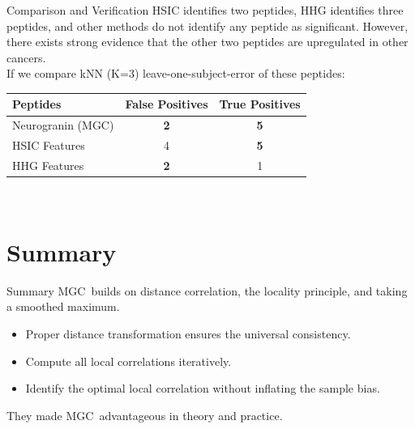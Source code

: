 \documentclass[mathserif,t]{beamer}
\newcommand{\Mgc}{MGC}
\begin{document}
\begin{frame}{Comparison and Verification}
\pause
HSIC identifies two peptides, HHG identifies three peptides, and other methods do not identify any peptide as significant. However, there exists strong evidence that the other two peptides are upregulated in other cancers.\\

\pause
\medskip
If we compare kNN (K=3) leave-one-subject-error of these peptides: 
\medskip
\begin{tabular}{|l||c|c|}
\hline
Peptides & False Positives & True Positives   \\
\hline
 \textcolor{UniOrange}{Neurogranin (MGC)}  & \textbf{2}  & \textbf{5} \\
\hline
HSIC Features & 4  & \textbf{5}  \\
\hline
HHG Features & \textbf{2}  & 1  \\
\hline
\end{tabular}\\
\pause
\medskip
\end{frame}

\section{Summary}
\begin{frame}{Summary}
\pause
\Mgc~builds on distance correlation, the locality principle, and taking a smoothed maximum.

\pause
\medskip
\begin{itemize}[<+->]
\item Proper distance transformation ensures the universal consistency.
\item Compute all local correlations iteratively.
\item Identify the optimal local correlation without inflating the sample bias.
\end{itemize}
\pause
\medskip
They made \Mgc~advantageous in theory and practice.\\
\end{frame}
\end{document}
